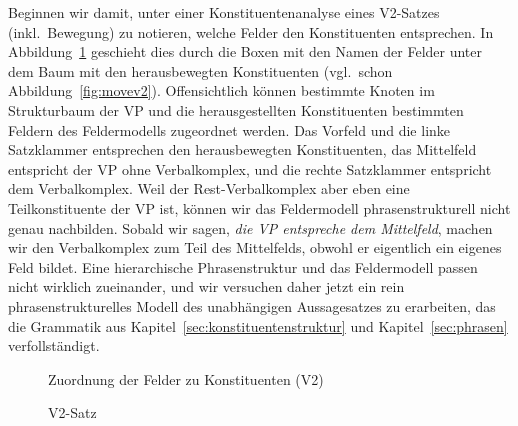 Beginnen wir damit, unter einer Konstituentenanalyse eines V2-Satzes (inkl.\ Bewegung) zu notieren, welche Felder den Konstituenten entsprechen.
In Abbildung~\ref{fig:movev2konstituenten} geschieht dies durch die Boxen mit den Namen der Felder unter dem Baum mit den herausbewegten Konstituenten (vgl.\ schon Abbildung~\ref{fig:movev2}).
Offensichtlich können bestimmte Knoten im Strukturbaum der VP und die herausgestellten Konstituenten bestimmten Feldern des Feldermodells zugeordnet werden.
Das Vorfeld und die linke Satzklammer entsprechen den herausbewegten Konstituenten, das Mittelfeld entspricht der VP ohne Verbalkomplex, und die rechte Satzklammer entspricht dem Verbalkomplex.
Weil der Rest-Verbalkomplex aber eben eine Teilkonstituente der VP ist, können wir das Feldermodell phrasenstrukturell nicht genau nachbilden.
Sobald wir sagen, \textit{die VP entspreche dem Mittelfeld}, machen wir den Verbalkomplex zum Teil des Mittelfelds, obwohl er eigentlich ein eigenes Feld bildet.
Eine hierarchische Phrasenstruktur und das Feldermodell passen nicht wirklich zueinander, und wir versuchen daher jetzt ein rein phrasenstrukturelles Modell des unabhängigen Aussagesatzes zu erarbeiten, das die Grammatik aus Kapitel~\ref{sec:konstituentenstruktur} und Kapitel~\ref{sec:phrasen} verfollständigt.

\begin{figure}
  \caption{Zuordnung der Felder zu Konstituenten (V2)}
  \label{fig:movev2konstituenten}
\end{figure}

\begin{figure}
  \vspace{0.3cm}
  \caption{V2-Satz}
  \label{fig:v2satz}
\end{figure}

